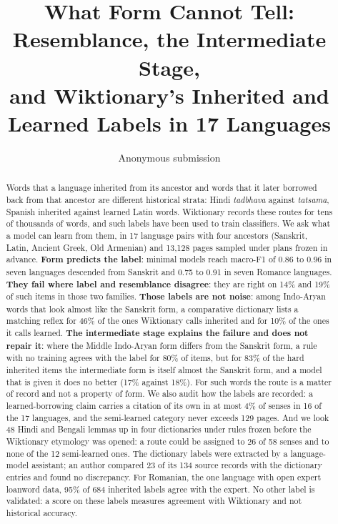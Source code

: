 \documentclass[11pt]{article}
\title{What Form Cannot Tell: Resemblance, the Intermediate Stage,\\and Wiktionary's Inherited and Learned Labels in 17 Languages}
\author{Anonymous submission}
\begin{document}
\maketitle

\begin{abstract}
Words that a language inherited from its ancestor and words that it later borrowed back from that ancestor are different historical strata: Hindi \textit{tadbhava} against \textit{tatsama}, Spanish inherited against learned Latin words. Wiktionary records these routes for tens of thousands of words, and such labels have been used to train classifiers. We ask what a model can learn from them, in 17 language pairs with four ancestors (Sanskrit, Latin, Ancient Greek, Old Armenian) and 13,128 pages sampled under plans frozen in advance. \textbf{Form predicts the label}: minimal models reach macro-F1 of 0.86 to 0.96 in seven languages descended from Sanskrit and 0.75 to 0.91 in seven Romance languages. \textbf{They fail where label and resemblance disagree}: they are right on 14\% and 19\% of such items in those two families. \textbf{Those labels are not noise}: among Indo-Aryan words that look almost like the Sanskrit form, a comparative dictionary lists a matching reflex for 46\% of the ones Wiktionary calls inherited and for 10\% of the ones it calls learned. \textbf{The intermediate stage explains the failure and does not repair it}: where the Middle Indo-Aryan form differs from the Sanskrit form, a rule with no training agrees with the label for 80\% of items, but for 83\% of the hard inherited items the intermediate form is itself almost the Sanskrit form, and a model that is given it does no better (17\% against 18\%). For such words the route is a matter of record and not a property of form. We also audit how the labels are recorded: a learned-borrowing claim carries a citation of its own in at most 4\% of senses in 16 of the 17 languages, and the semi-learned category never exceeds 129 pages. And we look 48 Hindi and Bengali lemmas up in four dictionaries under rules frozen before the Wiktionary etymology was opened: a route could be assigned to 26 of 58 senses and to none of the 12 semi-learned ones. The dictionary labels were extracted by a language-model assistant; an author compared 23 of its 134 source records with the dictionary entries and found no discrepancy. For Romanian, the one language with open expert loanword data, 95\% of 684 inherited labels agree with the expert. No other label is validated: a score on these labels measures agreement with Wiktionary and not historical accuracy.
\end{abstract}
\end{document}
